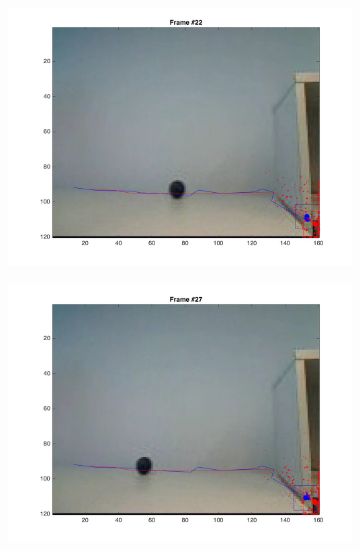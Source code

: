 \documentclass{ethz_report}
\begin{document}
\begin{figure}[h]
\begin{subfigure}[b]{.25\textwidth}
        \includegraphics[width=1\linewidth]{images/video3_observe_high_21}
    \end{subfigure}%
    \begin{subfigure}[b]{.25\textwidth}
        \centering
        \includegraphics[width=1\linewidth]{images/video3_observe_high_26}
    \end{subfigure}%
    \begin{subfigure}[b]{.25\textwidth}
        \centering

\end{subfigure}
\end{figure}
\end{document}
